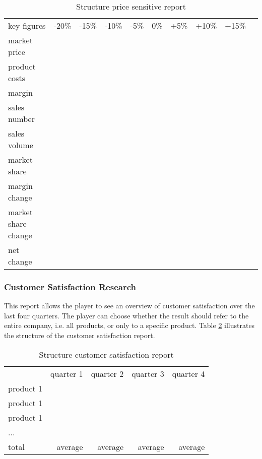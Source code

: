 \begin{table}[ht]
\centering
\begin{tabular}{|l|r|r|r|r|r|r|r|r|r|}
\hline
key figures             & -20\% & -15\% & -10\% & -5\%  & 0\%   & +5\%  & +10\% & +15\%   \\
market price            &       &       &       &       &       &       &       &         \\
product costs           &       &       &       &       &       &       &       &         \\
margin                  &       &       &       &       &       &       &       &         \\
sales number            &       &       &       &       &       &       &       &         \\
sales volume            &       &       &       &       &       &       &       &         \\
market share            &       &       &       &       &       &       &       &         \\
margin change           &       &       &       &       &       &       &       &         \\
market share change     &       &       &       &       &       &       &       &         \\
net change              &       &       &       &       &       &       &       &         \\
\hline
\end{tabular}
\caption{Structure price sensitive report}
\label{MR_price_sensitive}
\end{table}

\subsubsection{Customer Satisfaction Research}
This report allows the player to see an overview of customer satisfaction over the last four quarters. The player can choose whether the result should refer to the entire company, i.e. all products, or only to a specific product. Table \ref{MR_customer_satisfaction} illustrates the structure of the customer satisfaction report. 

\begin{table}[ht]
\centering
\begin{tabular}{|l|r|r|r|r|}
\hline
            & quarter 1   & quarter 2  & quarter 3 & quarter 4 \\
product 1   &             &            &           &           \\
product 1   &             &            &           &           \\
product 1   &             &            &           &           \\
...         &             &            &           &           \\
total       & average     & average    & average   & average   \\
\hline
\end{tabular}
\caption{Structure customer satisfaction report}
\label{MR_customer_satisfaction}
\end{table}

